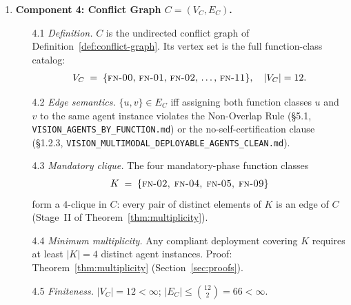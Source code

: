 \documentclass[12pt]{article}
\theoremstyle{definition}
\newcommand{\code}[1]{\texttt{#1}}
\newcommand{\FN}[1]{\textsc{fn-#1}}
\DeclareMathOperator{\Approved}{Approved}
\newcommand{\VisionClean}{\code{VISION\_MULTIMODAL\_\allowbreak DEPLOYABLE\_\allowbreak AGENTS\_CLEAN.md}}
\newcommand{\VisionFunc}{\code{VISION\_AGENTS\_\allowbreak BY\_FUNCTION.md}}
\begin{document}
\begin{enumerate}
\begin{enumerate}
               lower (more trusted) tier.  No other agent may alter
               $\tau(c)$ downward.  Authority: Table~8.1,
               \VisionClean{}.
    \item[3.4] \emph{Invariant.}
               Every subagent-originated content item $c$ satisfies
               $\tau(c) = \mathrm{T\text{-}3}$ throughout a session
               unless it has been the subject of an explicit
               \FN{08} $\Approved$ certificate event.
               Proof: Theorem~\ref{thm:trust}
               (Section~\ref{sec:proofs}).
    \item[3.5] \emph{Well-definedness.}
               $\tau$ is a total function: every content item receives
               a tier assignment at the moment of production (H2 of
               Theorem~\ref{thm:trust}).  No content item is left
               unclassified.
  \end{enumerate}

  \item \textbf{Component 4: Conflict Graph $C = (V_C, E_C)$.}
  \begin{enumerate}
    \item[4.1] \emph{Definition.}
               $C$ is the undirected conflict graph of
               Definition~\ref{def:conflict-graph}.  Its vertex set
               is the full function-class catalog:
               \begin{align}
                 V_C
                 \;=\;
                 \{\FN{00},\,\FN{01},\,\FN{02},\,\ldots,\,\FN{11}\},
                 \quad
                 |V_C| = 12.
                 \label{eq:VC-def}
               \end{align}
    \item[4.2] \emph{Edge semantics.}
               $\{u,v\} \in E_C$ iff assigning both function classes
               $u$ and $v$ to the same agent instance violates the
               Non-Overlap Rule (\S5.1, \VisionFunc{}) or the
               no-self-certification clause (\S1.2.3, \VisionClean{}).
    \item[4.3] \emph{Mandatory clique.}
               The four mandatory-phase function classes
               \begin{align}
                 K
                 \;=\;
                 \{\FN{02},\;\FN{04},\;\FN{05},\;\FN{09}\}
                 \label{eq:K-def}
               \end{align}
               form a $4$-clique in $C$: every pair of distinct
               elements of $K$ is an edge of $C$
               (Stage~II of Theorem~\ref{thm:multiplicity}).
    \item[4.4] \emph{Minimum multiplicity.}
               Any compliant deployment covering $K$ requires at least
               $|K| = 4$ distinct agent instances.
               Proof: Theorem~\ref{thm:multiplicity}
               (Section~\ref{sec:proofs}).
    \item[4.5] \emph{Finiteness.}
               $|V_C| = 12 < \infty$;
               $|E_C| \leq \binom{12}{2} = 66 < \infty$.
  \end{enumerate}


\end{enumerate}
\end{document}
